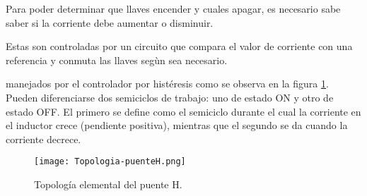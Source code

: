Para poder determinar que llaves encender y cuales apagar, es necesario sabe saber si la corriente debe aumentar o disminuir.

Estas son controladas por un circuito que compara el valor de corriente con una referencia y conmuta las llaves segùn sea necesario.

 manejados por el controlador por histéresis como se observa en la figura \ref{fig:img_topologia-puenteH}. Pueden diferenciarse dos semiciclos de trabajo: uno de estado ON y otro de estado OFF. El primero se define como el semiciclo durante el cual la corriente en el inductor crece (pendiente positiva), mientras que el segundo se da cuando la corriente decrece.

\begin{figure}[H]
	\centering
	\texttt{[image: Topologia-puenteH.png]}
	\caption{Topología elemental del puente H.}
	\label{fig:img_topologia-puenteH}
\end{figure}
